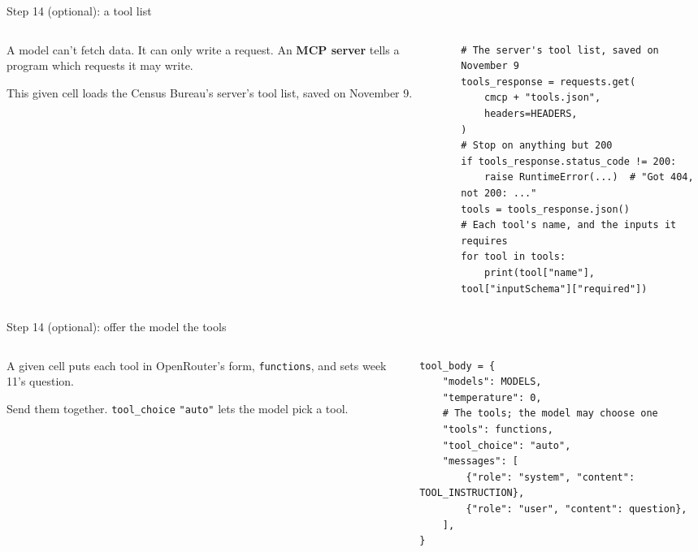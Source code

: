 \documentclass[9pt,aspectratio=169]{beamer}
\begin{document}
\begin{frame}[fragile]{Step 14 (optional): a tool list}
    \begin{columns}[T]
        \begin{column}{0.37\textwidth}
            A model can't fetch data. It can only write a request. An \textbf{MCP server} tells a program which requests it may write.

            \medskip
            This given cell loads the Census Bureau's server's tool list, saved on November 9.
        \end{column}
        \begin{column}{0.6\textwidth}
\begin{lstlisting}
# The server's tool list, saved on November 9
tools_response = requests.get(
    cmcp + "tools.json",
    headers=HEADERS,
)
# Stop on anything but 200
if tools_response.status_code != 200:
    raise RuntimeError(...)  # "Got 404, not 200: ..."
tools = tools_response.json()
# Each tool's name, and the inputs it requires
for tool in tools:
    print(tool["name"], tool["inputSchema"]["required"])
\end{lstlisting}
        \end{column}
    \end{columns}
\end{frame}

\begin{frame}[fragile]{Step 14 (optional): offer the model the tools}
    \begin{columns}[T]
        \begin{column}{0.37\textwidth}
            A given cell puts each tool in OpenRouter's form, \texttt{functions}, and sets week 11's question.

            \medskip
            Send them together. \texttt{tool\_choice} \texttt{"auto"} lets the model pick a tool.
        \end{column}
        \begin{column}{0.6\textwidth}
\begin{lstlisting}
tool_body = {
    "models": MODELS,
    "temperature": 0,
    # The tools; the model may choose one
    "tools": functions,
    "tool_choice": "auto",
    "messages": [
        {"role": "system", "content": TOOL_INSTRUCTION},
        {"role": "user", "content": question},
    ],
}
\end{lstlisting}
        \end{column}
    \end{columns}
\end{frame}
\end{document}
